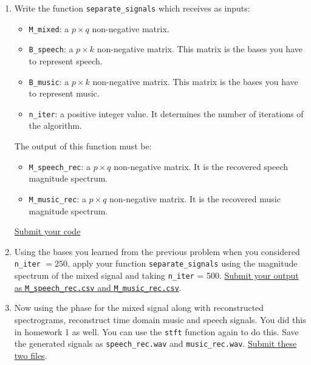 \begin{enumerate}
    \item Write the function \texttt{separate\_signals} which receives as inputs:
    \begin{itemize}
        \item \texttt{M\_mixed}: a $p \times q$ non-negative matrix. 
        \item \texttt{B\_speech}:  a $p \times k$ non-negative matrix. This matrix is the bases you have to represent speech.
        \item \texttt{B\_music}: a $p \times k$ non-negative matrix. This matrix is the bases you have to represent music.
        \item \texttt{n\_iter}: a positive integer value. It determines the number of iterations of the algorithm.
    \end{itemize}
    The output of this function must be:
    \begin{itemize}
        \item \texttt{M\_speech\_rec}: a $p \times q$ non-negative matrix. It is the recovered speech magnitude spectrum.
        \item \texttt{M\_music\_rec}: a $p \times q$ non-negative matrix. It is the recovered music magnitude spectrum.
    \end{itemize}
    \ul{Submit your code}
    
    \item Using the bases you learned from the previous problem when you considered \texttt{n\_iter} $= 250$, apply your function \texttt{separate\_signals} using the magnitude spectrum of the mixed signal and taking \texttt{n\_iter} = 500. \ul{Submit your output as \texttt{M\_speech\_rec.csv} and \texttt{M\_music\_rec.csv}}.
    
    
    \item Now using the phase for the mixed signal along with reconstructed spectrograms, reconstruct time domain music and speech signals. You did this in homework 1 as well. You can use the \texttt{stft} function again to do this. Save the generated signals as \texttt{speech\_rec.wav} and \texttt{music\_rec.wav}. \ul{Submit these two files}.
    
    
\end{enumerate}